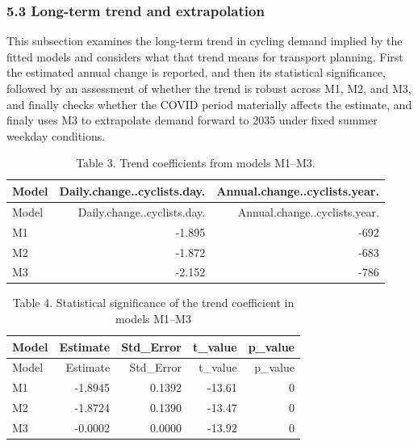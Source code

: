 \documentclass[
]{article}
\begin{document}
\subsubsection{5.3 Long-term trend and
extrapolation}\label{long-term-trend-and-extrapolation}

This subsection examines the long-term trend in cycling demand implied
by the fitted models and considers what that trend means for transport
planning. First the estimated annual change is reported, and then its
statistical significance, followed by an assessment of whether the trend
is robust across M1, M2, and M3, and finally checks whether the COVID
period materially affects the estimate, and finaly uses M3 to
extrapolate demand forward to 2035 under fixed summer weekday
conditions.

\begin{longtable}[]{@{}lrr@{}}
\caption{Table 3. Trend coefficients from models M1--M3.}\tabularnewline
\toprule\noalign{}
Model & Daily.change..cyclists.day. & Annual.change..cyclists.year. \\
\midrule\noalign{}
\endfirsthead
\toprule\noalign{}
Model & Daily.change..cyclists.day. & Annual.change..cyclists.year. \\
\midrule\noalign{}
\endhead
\bottomrule\noalign{}
\endlastfoot
M1 & -1.895 & -692 \\
M2 & -1.872 & -683 \\
M3 & -2.152 & -786 \\
\end{longtable}

\begin{longtable}[]{@{}lrrrr@{}}
\caption{Table 4. Statistical significance of the trend coefficient in
models M1--M3}\tabularnewline
\toprule\noalign{}
Model & Estimate & Std\_Error & t\_value & p\_value \\
\midrule\noalign{}
\endfirsthead
\toprule\noalign{}
Model & Estimate & Std\_Error & t\_value & p\_value \\
\midrule\noalign{}
\endhead
\bottomrule\noalign{}
\endlastfoot
M1 & -1.8945 & 0.1392 & -13.61 & 0 \\
M2 & -1.8724 & 0.1390 & -13.47 & 0 \\
M3 & -0.0002 & 0.0000 & -13.92 & 0 \\
\end{longtable}
\end{document}
